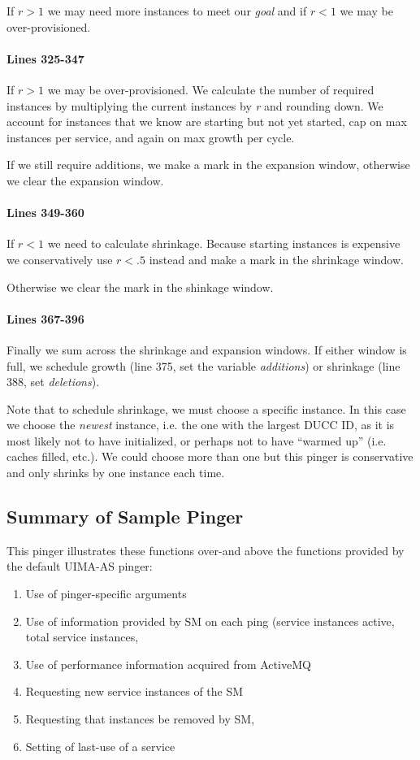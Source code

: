    If \( r > 1\) we may need more instances to meet our {\em goal} and if
   \( r < 1 \) we may be over-provisioned.

   \paragraph{Lines 325-347}
   If \( r > 1\) we may be over-provisioned.  We calculate the number of required
   instances by multiplying the current instances by {\em r} and rounding down.
   We account for instances that we know are starting but not yet started,
   cap on max instances per service, and again on max growth per cycle.

   If we still require additions, we make a mark in the expansion window, 
   otherwise we clear the expansion window.

   \paragraph{Lines 349-360}
   If \( r < 1 \) we need to calculate shrinkage.  Because starting instances
   is expensive we conservatively use \(r < .5\) instead and make a mark
   in the shrinkage window.  

   Otherwise we clear the mark in the shinkage window.

   \paragraph{Lines 367-396}
   Finally we sum across the shrinkage and expansion windows.  If either
   window is full, we schedule growth (line 375, set the variable {\em additions})
   or shrinkage (line 388, set {\em deletions}).

   Note that to schedule shrinkage, we must choose a specific instance.  In this
   case we choose the {\em newest} instance, i.e. the one with the largest
   DUCC ID, as it is most likely not to have initialized, or perhaps not to
   have ``warmed up'' (i.e. caches filled, etc.).  We could choose more than
   one but this pinger is conservative and only shrinks by one instance
   each time.

   \subsection{Summary of Sample Pinger}
   This pinger illustrates these functions over-and above the functions provided
   by the default UIMA-AS pinger:
   \begin{enumerate}
     \item Use of pinger-specific arguments
     \item Use of information provided by SM on each ping (service instances
       active, total service instances,
     \item Use of performance information acquired from ActiveMQ
     \item Requesting new service instances of the SM
     \item Requesting that instances be removed by SM,
     \item Setting of last-use of a service
   \end{enumerate}

